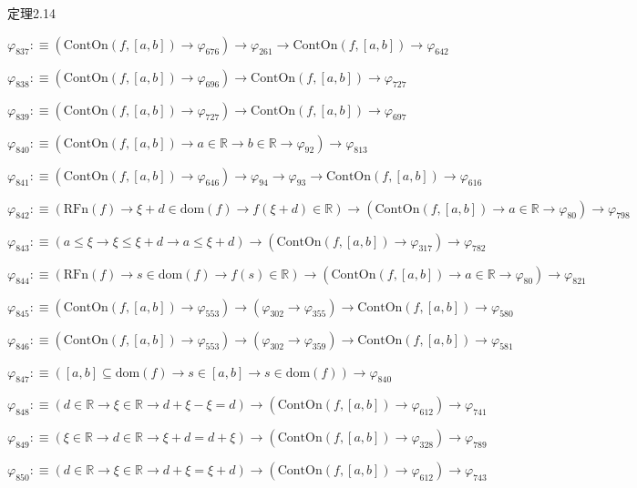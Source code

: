 \begin{fullproof}{定理2.14}
\begin{abbrevlist}
\item $\varphi_{837} :\equiv (\mathrm{ContOn}(f,[a,b]) \to \varphi_{676}) \to \varphi_{261} \to \mathrm{ContOn}(f,[a,b]) \to \varphi_{642}$
\item $\varphi_{838} :\equiv (\mathrm{ContOn}(f,[a,b]) \to \varphi_{696}) \to \mathrm{ContOn}(f,[a,b]) \to \varphi_{727}$
\item $\varphi_{839} :\equiv (\mathrm{ContOn}(f,[a,b]) \to \varphi_{727}) \to \mathrm{ContOn}(f,[a,b]) \to \varphi_{697}$
\item $\varphi_{840} :\equiv (\mathrm{ContOn}(f,[a,b]) \to a \in \mathbb{R} \to b \in \mathbb{R} \to \varphi_{92}) \to \varphi_{813}$
\item $\varphi_{841} :\equiv (\mathrm{ContOn}(f,[a,b]) \to \varphi_{646}) \to \varphi_{94} \to \varphi_{93} \to \mathrm{ContOn}(f,[a,b]) \to \varphi_{616}$
\item $\varphi_{842} :\equiv (\mathrm{RFn}(f) \to \xi + d \in \mathrm{dom}(f) \to f(\xi + d) \in \mathbb{R}) \to (\mathrm{ContOn}(f,[a,b]) \to a \in \mathbb{R} \to \varphi_{80}) \to \varphi_{798}$
\item $\varphi_{843} :\equiv (a \leq \xi \to \xi \leq \xi + d \to a \leq \xi + d) \to (\mathrm{ContOn}(f,[a,b]) \to \varphi_{317}) \to \varphi_{782}$
\item $\varphi_{844} :\equiv (\mathrm{RFn}(f) \to s \in \mathrm{dom}(f) \to f(s) \in \mathbb{R}) \to (\mathrm{ContOn}(f,[a,b]) \to a \in \mathbb{R} \to \varphi_{80}) \to \varphi_{821}$
\item $\varphi_{845} :\equiv (\mathrm{ContOn}(f,[a,b]) \to \varphi_{553}) \to (\varphi_{302} \to \varphi_{355}) \to \mathrm{ContOn}(f,[a,b]) \to \varphi_{580}$
\item $\varphi_{846} :\equiv (\mathrm{ContOn}(f,[a,b]) \to \varphi_{553}) \to (\varphi_{302} \to \varphi_{359}) \to \mathrm{ContOn}(f,[a,b]) \to \varphi_{581}$
\item $\varphi_{847} :\equiv ([a,b] \subseteq \mathrm{dom}(f) \to s \in [a,b] \to s \in \mathrm{dom}(f)) \to \varphi_{840}$
\item $\varphi_{848} :\equiv (d \in \mathbb{R} \to \xi \in \mathbb{R} \to d + \xi - \xi = d) \to (\mathrm{ContOn}(f,[a,b]) \to \varphi_{612}) \to \varphi_{741}$
\item $\varphi_{849} :\equiv (\xi \in \mathbb{R} \to d \in \mathbb{R} \to \xi + d = d + \xi) \to (\mathrm{ContOn}(f,[a,b]) \to \varphi_{328}) \to \varphi_{789}$
\item $\varphi_{850} :\equiv (d \in \mathbb{R} \to \xi \in \mathbb{R} \to d + \xi = \xi + d) \to (\mathrm{ContOn}(f,[a,b]) \to \varphi_{612}) \to \varphi_{743}$

\end{abbrevlist}
\end{fullproof}
